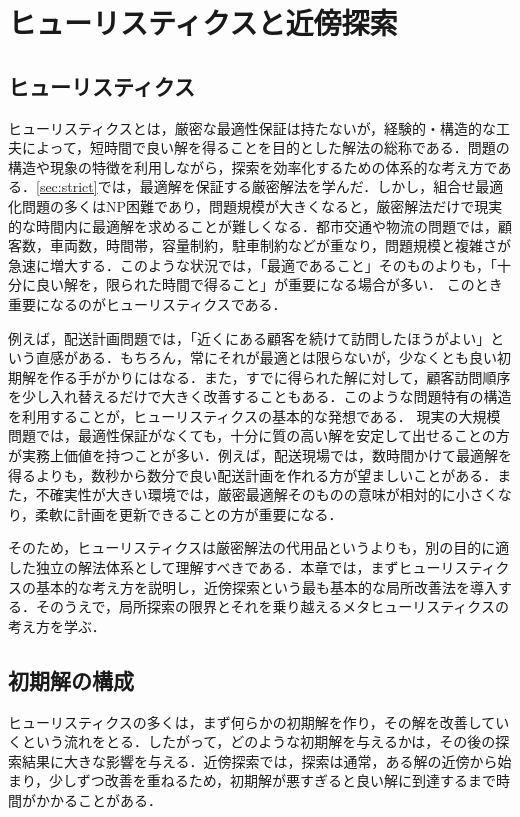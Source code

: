 \section{ヒューリスティクスと近傍探索}

\subsection{ヒューリスティクス}

ヒューリスティクスとは，厳密な最適性保証は持たないが，経験的・構造的な工夫によって，短時間で良い解を得ることを目的とした解法の総称である．問題の構造や現象の特徴を利用しながら，探索を効率化するための体系的な考え方である．\ref{sec:strict}では，最適解を保証する厳密解法を学んだ．しかし，組合せ最適化問題の多くはNP困難であり，問題規模が大きくなると，厳密解法だけで現実的な時間内に最適解を求めることが難しくなる．都市交通や物流の問題では，顧客数，車両数，時間帯，容量制約，駐車制約などが重なり，問題規模と複雑さが急速に増大する．このような状況では，「最適であること」そのものよりも，「十分に良い解を，限られた時間で得ること」が重要になる場合が多い．
このとき重要になるのがヒューリスティクスである\cite{BALL201121}．

例えば，配送計画問題では，「近くにある顧客を続けて訪問したほうがよい」という直感がある．もちろん，常にそれが最適とは限らないが，少なくとも良い初期解を作る手がかりにはなる．また，すでに得られた解に対して，顧客訪問順序を少し入れ替えるだけで大きく改善することもある．このような問題特有の構造を利用することが，ヒューリスティクスの基本的な発想である．
現実の大規模問題では，最適性保証がなくても，十分に質の高い解を安定して出せることの方が実務上価値を持つことが多い．例えば，配送現場では，数時間かけて最適解を得るよりも，数秒から数分で良い配送計画を作れる方が望ましいことがある．また，不確実性が大きい環境では，厳密最適解そのものの意味が相対的に小さくなり，柔軟に計画を更新できることの方が重要になる．

そのため，ヒューリスティクスは厳密解法の代用品というよりも，別の目的に適した独立の解法体系として理解すべきである．本章では，まずヒューリスティクスの基本的な考え方を説明し，近傍探索という最も基本的な局所改善法を導入する．そのうえで，局所探索の限界とそれを乗り越えるメタヒューリスティクスの考え方を学ぶ．

\subsection{初期解の構成}

ヒューリスティクスの多くは，まず何らかの初期解を作り，その解を改善していくという流れをとる．したがって，どのような初期解を与えるかは，その後の探索結果に大きな影響を与える．近傍探索では，探索は通常，ある解の近傍から始まり，少しずつ改善を重ねるため，初期解が悪すぎると良い解に到達するまで時間がかかることがある．

